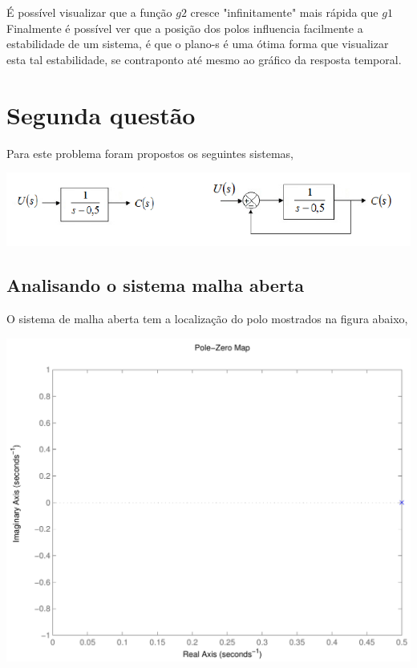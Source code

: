 \documentclass[paper=a4, fontsize=11pt]{article}
\begin{document}
É possível visualizar que a função $g2$ cresce "infinitamente" mais rápida que $g1$
Finalmente é possível ver que a posição dos polos influencia facilmente a 
estabilidade de um sistema, é que o plano-s é uma ótima forma que visualizar
esta tal estabilidade, se contraponto até mesmo ao gráfico da resposta temporal.


\section{Segunda questão}

Para este problema foram propostos os seguintes sistemas,

\begin{center}
    \includegraphics[scale=.5]{s2q.png}
\end{center}

\subsection{Analisando o sistema malha aberta}

O sistema de malha aberta tem a localização do polo mostrados na figura abaixo,

\begin{center}
    \includegraphics[scale=.5]{pz2qs1.pdf}
\end{center}
\end{document}
